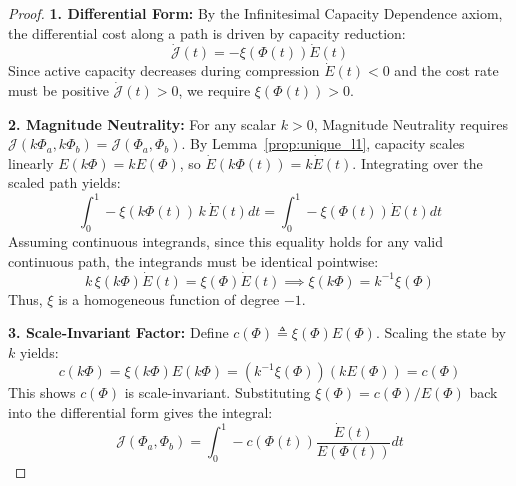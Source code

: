 \documentclass[11pt, a4paper, copyright, gdm]{google}
\newcommand{\calJ}{\mathcal{J}}
\theoremstyle{definition}
\begin{document}
\begin{proof}
\noindent\textbf{1. Differential Form:}
By the Infinitesimal Capacity Dependence axiom, the differential cost along a path is driven by capacity reduction:
\begin{equation*}
    \dot{\calJ}(t) = -\xi(\Phi(t)) \dot{E}(t)
\end{equation*}
Since active capacity decreases during compression $\dot{E}(t) < 0$ and the cost rate must be positive $\dot{\calJ}(t) > 0$, we require $\xi(\Phi(t)) > 0$.

\vspace{0.5em}
\noindent\textbf{2. Magnitude Neutrality:}
For any scalar $k > 0$, Magnitude Neutrality requires $\calJ(k\Phi_a, k\Phi_b) = \calJ(\Phi_a, \Phi_b)$. By Lemma~\ref{prop:unique_l1}, capacity scales linearly $E(k\Phi) = kE(\Phi)$, so $\dot{E}(k\Phi(t)) = k\dot{E}(t)$. Integrating over the scaled path yields:
\begin{equation*}
    \int_{0}^{1} -\xi(k\Phi(t)) \, k \, \dot{E}(t) dt = \int_{0}^{1} -\xi(\Phi(t)) \dot{E}(t) dt
\end{equation*}
Assuming continuous integrands, since this equality holds for any valid continuous path, the integrands must be identical pointwise:
\begin{equation*}
    k \, \xi(k\Phi) \dot{E}(t) = \xi(\Phi) \dot{E}(t) \implies \xi(k\Phi) = k^{-1} \xi(\Phi)
\end{equation*}
Thus, $\xi$ is a homogeneous function of degree $-1$.

\vspace{0.5em}
\noindent\textbf{3. Scale-Invariant Factor:}
Define $c(\Phi) \triangleq \xi(\Phi) E(\Phi)$. Scaling the state by $k$ yields:
\begin{equation*}
    c(k\Phi) = \xi(k\Phi) E(k\Phi) = (k^{-1} \xi(\Phi)) (k E(\Phi)) = c(\Phi)
\end{equation*}
This shows $c(\Phi)$ is scale-invariant. Substituting $\xi(\Phi) = c(\Phi) / E(\Phi)$ back into the differential form gives the integral:
\begin{equation*}
    \calJ(\Phi_a, \Phi_b) = \int_{0}^{1} -c(\Phi(t)) \frac{\dot{E}(t)}{E(\Phi(t))} dt
\end{equation*}


\end{proof}
\end{document}
